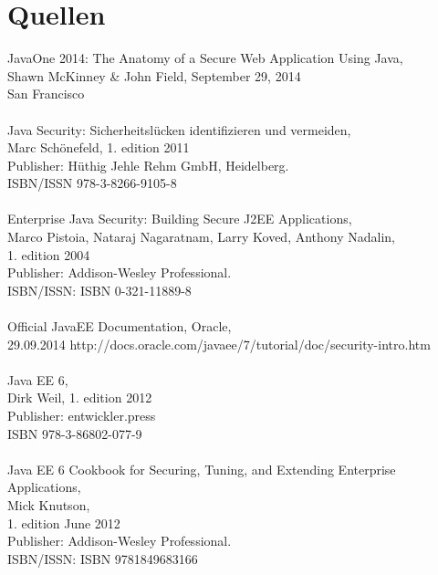 \documentclass[12pt,a4paper,draft]{report}
\begin{document}
\section*{Quellen}
JavaOne 2014: The Anatomy of a Secure Web Application Using Java, \\
Shawn McKinney \& John Field, September 29, 2014\\
San Francisco\\\\
Java Security: Sicherheitslücken identifizieren und vermeiden, \\
Marc Schönefeld, 1. edition 2011\\
Publisher: Hüthig Jehle Rehm GmbH, Heidelberg. \\
ISBN/ISSN 978-3-8266-9105-8\\\\
Enterprise Java Security: Building Secure J2EE Applications,\\
Marco Pistoia, Nataraj Nagaratnam, Larry Koved, Anthony Nadalin,\\
1. edition 2004 \\
Publisher: Addison-Wesley Professional.\\
ISBN/ISSN: ISBN 0-321-11889-8\\\\
Official JavaEE Documentation, Oracle,\\
29.09.2014
http://docs.oracle.com/javaee/7/tutorial/doc/security-intro.htm\\\\
Java EE 6,\\
Dirk Weil, 1. edition 2012\\
Publisher: entwickler.press\\
ISBN 978-3-86802-077-9\\\\
Java EE 6 Cookbook for Securing, Tuning, and Extending Enterprise Applications,\\
Mick Knutson,\\
1. edition June 2012 \\
Publisher: Addison-Wesley Professional.\\
ISBN/ISSN: ISBN 9781849683166\\\\
\end{document}
